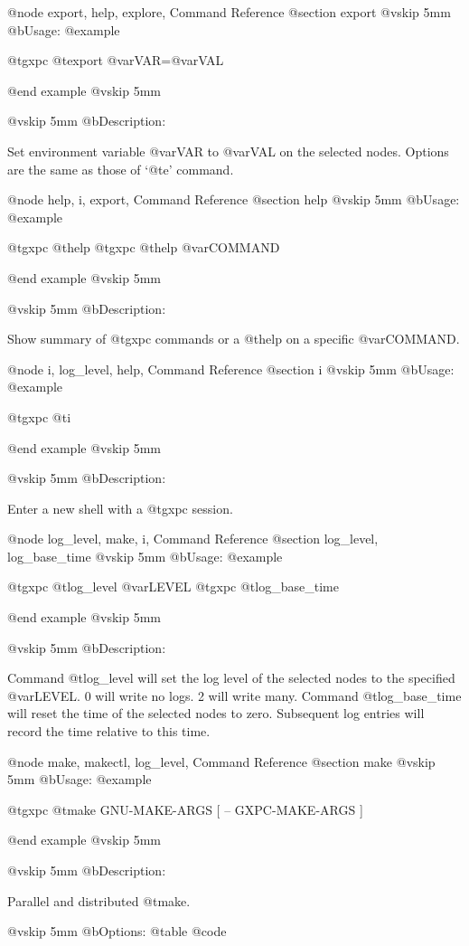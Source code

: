 @node export, help, explore, Command Reference
@section export
@vskip 5mm
@b{Usage:}
@example

  @t{gxpc} @t{export} @var{VAR}=@var{VAL}

@end example
@vskip 5mm

@vskip 5mm
@b{Description:}


  Set environment variable @var{VAR} to @var{VAL} on the selected nodes.
Options are the same as those of `@t{e}' command.

@node help, i, export, Command Reference
@section help
@vskip 5mm
@b{Usage:}
@example

  @t{gxpc} @t{help}
  @t{gxpc} @t{help} @var{COMMAND}

@end example
@vskip 5mm

@vskip 5mm
@b{Description:}


  Show summary of @t{gxpc} commands or a @t{help} on a specific @var{COMMAND}.

@node i, log_level, help, Command Reference
@section i
@vskip 5mm
@b{Usage:}
@example

  @t{gxpc} @t{i}

@end example
@vskip 5mm

@vskip 5mm
@b{Description:}


  Enter a new shell with a @t{gxpc} session.

@node log_level, make, i, Command Reference
@section log_level, log_base_time
@vskip 5mm
@b{Usage:}
@example

  @t{gxpc} @t{log_level} @var{LEVEL}
  @t{gxpc} @t{log_base_time}

@end example
@vskip 5mm

@vskip 5mm
@b{Description:}


  Command @t{log_level} will set the log level of the selected nodes
to the specified @var{LEVEL}.  0 will write no logs. 2 will write many.
Command @t{log_base_time} will reset the time of the selected nodes
to zero.  Subsequent log entries will record the time relative to
this time.

@node make, makectl, log_level, Command Reference
@section make
@vskip 5mm
@b{Usage:}
@example

  @t{gxpc} @t{make} GNU-MAKE-ARGS [ -- GXPC-MAKE-ARGS ]

@end example
@vskip 5mm

@vskip 5mm
@b{Description:}


  Parallel and distributed @t{make}.

@vskip 5mm
@b{Options:}
@table @code


